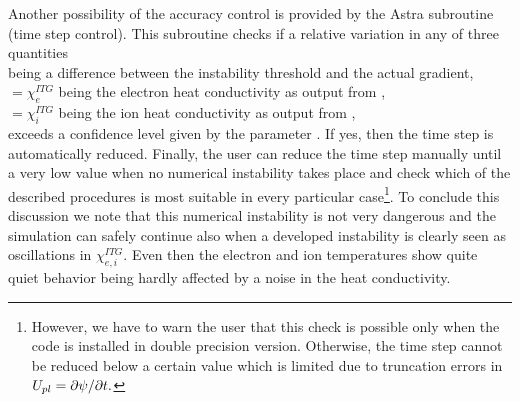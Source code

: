 Another possibility of the accuracy control is provided by the Astra 
subroutine  \linebreak (time step control).
This subroutine checks if a relative variation in any of three 
quantities
\\
\hspace*{2em}{\tt CAR27~} being
a difference between the instability threshold and the actual gradient,
\\
\hspace*{2em}{\tt CAR23} $=\chi_e^{ITG}$ being the
electron heat conductivity as output from ,\\
\hspace*{2em}{\tt CAR24} $=\chi_i^{ITG}$ being the
ion heat conductivity as output from ,\\
exceeds a confidence level given by the parameter .
If yes, then the time step is automatically reduced.
Finally, the user can reduce the time step manually until a very low
value when no numerical instability takes place and check which of
the described procedures is most suitable in every particular 
case\footnote
{However, we have to warn the user that this check is possible 
only when the code is installed in double precision version. 
Otherwise, the time step cannot be reduced below a certain value
which is limited due to truncation errors in $U_{pl}=\partial\psi/\partial t.$}.
To conclude this discussion we note that this numerical instability
is not very dangerous and the simulation can safely continue also 
when a developed instability is clearly seen as oscillations in 
$\chi_{e,i}^{ITG}.$ 
Even then the electron and ion temperatures show quite quiet behavior
being hardly affected by a noise in the heat conductivity.

